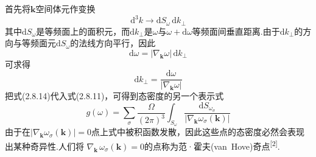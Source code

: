 首先将$\boldsymbol{k}$空间体元作变换
\begin{equation*}
  \mathrm{d}^3k\to\mathrm{d}S_{\omega}\,\mathrm{d}k_{\perp}
\end{equation*}
其中$\mathrm{d}S_{\omega}$是等频面上的面积元，而$\mathrm{d}k_{\perp}$是$\omega$与$\omega+\mathrm{d}\omega$等频面间垂直距离.由于$\mathrm{d}k_{\perp}$的方向与等频面元$\mathrm{d}S_{\omega}$的法线方向平行，因此
\begin{equation*}
  \mathrm{d}\omega=|\nabla_{\boldsymbol{k}}\omega|\,\mathrm{d}k_{\perp}
\end{equation*}
可求得
\begin{equation}
  \mathrm{d}k_{\perp}=\frac{\mathrm{d}\omega}{|\nabla_{\boldsymbol{k}}\omega|}
\end{equation}
把式(2.8.14)代入式(2.8.11)，可得到态密度的另一个表示式
\begin{equation}
  g(\omega)=\sum_{\sigma}\frac{\Omega}{(2\pi)^3}
  \int_{S_{\omega}}\frac{\mathrm{d}S_{\omega_{\sigma}}}
  {|\nabla_{\boldsymbol{k}}\omega_{\sigma}(\boldsymbol{k})|}
\end{equation}
由于在$|\nabla_{\boldsymbol{k}}\omega_{\sigma}(\boldsymbol{k})|=0$点上式中被积函数发散，因此这些点的态密度必然会表现出某种奇异性.人们将
$\nabla_{\boldsymbol{k}}\,\omega_{\sigma}(\boldsymbol{k})=0$的点称为范·霍夫(van\ Hove)奇点\textsuperscript{[2]}.

